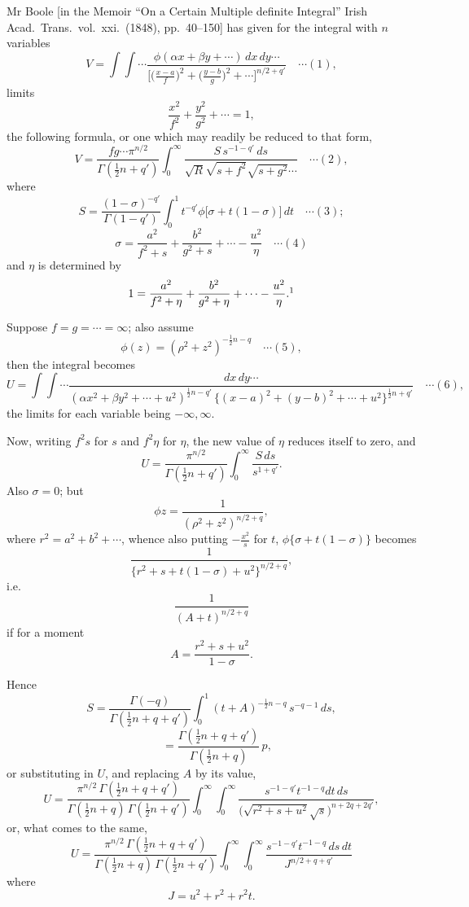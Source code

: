 \documentclass[12pt,a4paper]{article}
\begin{document}
\bigskip

Mr Boole [in the Memoir ``On a Certain Multiple definite Integral'' Irish Acad.\ Trans.\ vol.~xxi.~(1848), pp.~40--150] has given for the integral with $n$ variables
\[
V = \int\!\!\int\cdots \frac{\phi(\alpha x + \beta y + \cdots)\,dx\,dy\cdots}{\bigl[\bigl(\tfrac{x-a}{f}\bigr)^2 + \bigl(\tfrac{y-b}{g}\bigr)^2 + \cdots\bigr]^{n/2 + q'}} \quad\cdots(1),
\]
limits
\[
\frac{x^2}{f^2} + \frac{y^2}{g^2} + \cdots = 1,
\]
the following formula, or one which may readily be reduced to that form,
\[
V = \frac{fg\cdots \pi^{n/2}}{\Gamma(\tfrac12 n + q')}\int_0^\infty \frac{S\,s^{-1-q'}\,ds}{\sqrt{R}\sqrt{s+f^2}\sqrt{s+g^2}\cdots} \quad\cdots(2),
\]
where
\[
S = \frac{(1-\sigma)^{-q'}}{\Gamma(1-q')}\int_0^1 t^{-q'}\phi\bigl[\sigma + t(1-\sigma)\bigr]\,dt \quad\cdots(3);
\]
\[
\sigma = \frac{a^2}{f^2 + s} + \frac{b^2}{g^2 + s} + \cdots - \frac{u^2}{\eta} \quad\cdots(4)
\]
and $\eta$ is determined by
\[
1 = \frac{a^2}{f^2 + \eta} + \frac{b^2}{g^2 + \eta} + \cdots - \frac{u^2}{\eta}.\footnotemark
\]

Suppose $f = g = \cdots = \infty$; also assume
\[
\phi(z) = (\rho^2 + z^2)^{-\tfrac12 n - q} \quad\cdots(5),
\]
then the integral becomes
\[
U = \int\!\!\int\cdots \frac{dx\,dy\cdots}{(\alpha x^2 + \beta y^2 + \cdots + u^2)^{\tfrac12 n - q'}\,\{(x-a)^2 + (y-b)^2 + \cdots + u^2\}^{\tfrac12 n + q'}} \quad\cdots(6),
\]
the limits for each variable being $-\infty,\infty$.

Now, writing $f^2 s$ for $s$ and $f^2 \eta$ for $\eta$, the new value of $\eta$ reduces itself to zero, and
\[
U = \frac{\pi^{n/2}}{\Gamma(\tfrac12 n + q')}\int_0^\infty \frac{S\,ds}{s^{1+q'}}.
\]
Also $\sigma = 0$; but
\[
\phi z = \frac{1}{(\rho^2 + z^2)^{n/2 + q}},
\]
where $r^2 = a^2 + b^2 + \cdots$, whence also putting $-\frac{x^2}{s}$ for $t$, $\phi\{\sigma + t(1-\sigma)\}$ becomes
\[
\frac{1}{\{r^2 + s + t(1-\sigma) + u^2\}^{n/2 + q}},
\]
i.e.
\[
\frac{1}{(A + t)^{n/2 + q}}
\]
if for a moment
\[
A = \frac{r^2 + s + u^2}{1-\sigma}.
\]

Hence
\[
S = \frac{\Gamma(-q)}{\Gamma(\tfrac12 n + q + q')}\int_0^1 (t+A)^{-\tfrac12 n - q}\,s^{-q-1}\,ds,
\]
\[
\quad = \frac{\Gamma(\tfrac12 n + q + q')}{\Gamma(\tfrac12 n + q)}\,p,
\]
or substituting in $U$, and replacing $A$ by its value,
\[
U = \frac{\pi^{n/2}\,\Gamma(\tfrac12 n + q + q')}{\Gamma(\tfrac12 n + q)\,\Gamma(\tfrac12 n + q')}\int_0^\infty\!\int_0^\infty \frac{s^{-1-q'} t^{-1-q} dt\,ds}{\bigl(\sqrt{r^2 + s + u^2}\sqrt{s}\bigr)^{n + 2q + 2q'}},
\]
or, what comes to the same,
\[
U = \frac{\pi^{n/2}\,\Gamma(\tfrac12 n + q + q')}{\Gamma(\tfrac12 n + q)\,\Gamma(\tfrac12 n + q')}\int_0^\infty\int_0^\infty\frac{s^{-1-q'} t^{-1-q}\,ds\,dt}{J^{n/2 + q + q'}}
\]
where
\[
J = u^2 + r^2 + r^2 t.
\]
\end{document}
